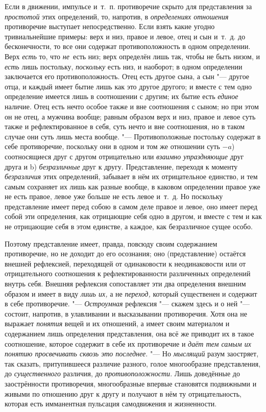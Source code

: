 Если в движении, импульсе и~т.~п. противоречие скрыто для представления за
{\em простотой} этих определений, то, напротив, в
{\em определениях отношения} противоречие выступает
непосредственно. Если взять какие угодно тривиальнейшие примеры: верх и
низ, правое и левое, отец и сын и~т.~д. до бесконечности, то все они
содержат противоположность в одном определении. Верх
{\em есть} то, что {\em не}~есть
низ; верх определён лишь так, чтобы не быть низом, и
{\em есть} лишь постольку, {\em поскольку} есть низ, и наоборот; в одном
определении заключается его противоположность. Отец есть другое сына, а сын
"--- другое отца, и каждый имеет бытие лишь как это другое другого; и вместе с
тем одно определение имеется лишь в соотношении с другим; их бытие есть
{\em единое} наличие. Отец есть нечто особое также и
вне соотношения с сыном; но при этом он не отец, а мужчина вообще; равным
образом верх и низ, правое и левое суть также и рефлектированное в себя,
суть нечто и вне соотношения, но в таком случае они суть лишь места вообще.
"--- Противоположные постольку содержат в себе противоречие, поскольку они в
одном и том же отношении суть $-a$) соотносящиеся
друг с другом отрицательно или {\em взаимно
упраздняющие} друг друга и b) {\em безразличные} друг к
другу. Представление, переходя к моменту
{\em безразличия} этих определений, забывает в нём их
отрицательное единство, и тем самым сохраняет их лишь как разные вообще, в
каковом определении правое уже не есть правое, левое уже больше не есть
левое и~т.~д. Но поскольку представление имеет перед собою в самом деле
правое и левое, оно имеет перед собой эти определения, как отрицающие себя
одно в другом, и вместе с тем и как не отрицающие себя в этом единстве, а
каждое, как безразличное сущее особо.

Поэтому представление имеет, правда, повсюду своим содержанием противоречие,
но не доходит до его осознания; оно (представление) остаётся внешней
рефлексией, переходящей от одинаковости к неодинаковости или от
отрицательного соотношения к рефлектированности различенных определений
внутрь себя. Внешняя рефлексия сопоставляет эти два определения внешним
образом и имеет в виду {\em лишь их,} а не
{\em переход,} который существенен и содержит в себе
противоречие. "--- {\em Остроумная} рефлексия "--- скажем
здесь и о ней "--- состоит, напротив, в улавливании и высказывании
противоречия. Хотя она не выражает {\em понятия} вещей
и их отношений, а имеет своим материалом и содержанием лишь определения
представления, она всё же приводит их в такое соотношение, которое содержит
в себе их противоречие и {\em даёт тем самым их понятию
просвечивать сквозь это последнее}. "--- Но {\em мыслящий}
разум заостряет, так сказать, притупившееся различие разного, голое
многообразие представления, до {\em существенного}
различия, до {\em противоположности}. Лишь доведённые
до заострённости противоречия, многообразные впервые становятся подвижными
и живыми по отношению друг к другу и получают в нём ту отрицательность,
которая есть имманентная пульсация самодвижения и жизненности.

